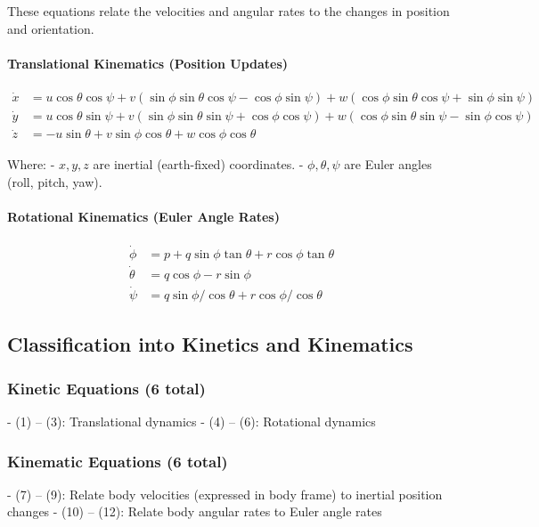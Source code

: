 \documentclass{article}
\begin{document}
These equations relate the velocities and angular rates to the changes in position and orientation.

\paragraph{Translational Kinematics (Position Updates)}
\begin{align}
    \dot{x} &= u \cos\theta \cos\psi + v (\sin\phi \sin\theta \cos\psi - \cos\phi \sin\psi) + w (\cos\phi \sin\theta \cos\psi + \sin\phi \sin\psi) \\
    \dot{y} &= u \cos\theta \sin\psi + v (\sin\phi \sin\theta \sin\psi + \cos\phi \cos\psi) + w (\cos\phi \sin\theta \sin\psi - \sin\phi \cos\psi) \\
    \dot{z} &= - u \sin\theta + v \sin\phi \cos\theta + w \cos\phi \cos\theta
\end{align}

Where:
- \( x, y, z \) are inertial (earth-fixed) coordinates.
- \( \phi, \theta, \psi \) are Euler angles (roll, pitch, yaw).

\paragraph{Rotational Kinematics (Euler Angle Rates)}
\begin{align}
    \dot{\phi} &= p + q \sin\phi \tan\theta + r \cos\phi \tan\theta \\
    \dot{\theta} &= q \cos\phi - r \sin\phi \\
    \dot{\psi} &= q \sin\phi / \cos\theta + r \cos\phi / \cos\theta
\end{align}

\subsection{Classification into Kinetics and Kinematics}

\subsubsection{Kinetic Equations (6 total)}
- (1) – (3): Translational dynamics
- (4) – (6): Rotational dynamics

\subsubsection{Kinematic Equations (6 total)}
- (7) – (9): Relate body velocities (expressed in body frame) to inertial position changes
- (10) – (12): Relate body angular rates to Euler angle rates
\end{document}
